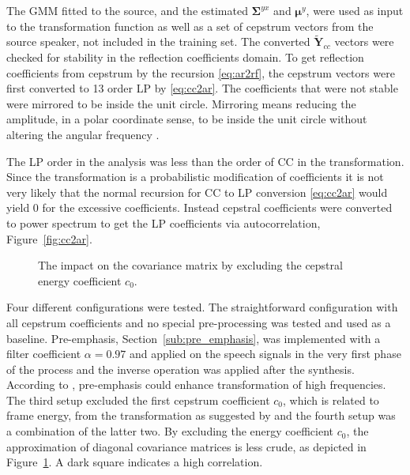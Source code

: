 The GMM fitted to the source, and the estimated $\mathbf{\Sigma}^{yx}$ and $\boldsymbol{\mu}^y$, were used as input to the transformation function as well as a set of cepstrum vectors from the source speaker, not included in the training set. The converted $\mathbf{\tilde{Y}}_{cc}$ vectors were checked for stability in the reflection coefficients domain. To get reflection coefficients from cepstrum by the recursion \eqref{eq:ar2rf}, the cepstrum vectors were first converted to 13 order LP by \eqref{eq:cc2ar}. The coefficients that were not stable were mirrored to be inside the unit circle. Mirroring means reducing the amplitude, in a polar coordinate sense, to be inside the unit circle without altering the angular frequency \cite{digsig}.

The LP order in the analysis was less than the order of CC in the transformation. Since the transformation is a probabilistic modification of coefficients it is not very likely that the normal recursion for CC to LP conversion \eqref{eq:cc2ar} would yield 0 for the excessive coefficients. Instead cepstral coefficients were converted to power spectrum to get the LP coefficients via autocorrelation, Figure~\ref{fig:cc2ar}.

\begin{figure}[htbp]
	\begin{center}
	\caption{The impact on the covariance matrix by excluding the cepstral energy coefficient $c_0$.}
	\label{fig:covar_impact}
	\end{center}
\end{figure}

Four different configurations were tested. The straightforward configuration with all cepstrum coefficients and no special pre-processing was tested and used as a baseline. Pre-emphasis, Section~\ref{sub:pre_emphasis}, was implemented with a filter coefficient $\alpha=0.97$ and applied on the speech signals in the very first phase of the process and the inverse operation was applied after the synthesis. According to \cite{turk06}, pre-emphasis could enhance transformation of high frequencies. The third setup excluded the first cepstrum coefficient $c_0$, which is related to frame energy, from the transformation as suggested by \cite{stylianou98} and the fourth setup was a combination of the latter two. By excluding the energy coefficient $c_0$, the approximation of diagonal covariance matrices is less crude, as depicted in Figure~\ref{fig:covar_impact}. A dark square indicates a high correlation.


